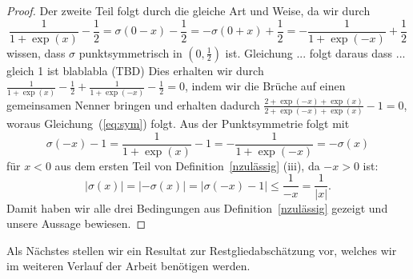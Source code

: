 \begin{proof}
Der zweite Teil folgt durch die gleiche Art und Weise, da wir durch 
\begin{equation}
\label{eq:sym}
\frac{1}{1 + \exp(x)} - \frac{1}{2}= \sigma(0 - x) - \frac{1}{2} = -\sigma(0 + x) + \frac{1}{2} = -\frac{1}{1 + \exp(-x)} + \frac{1}{2}
\end{equation}
wissen, dass $\sigma$ punktsymmetrisch in $(0, \frac{1}{2})$ ist. 
Gleichung ... folgt daraus dass ... gleich 1 ist blablabla (TBD)
Dies erhalten wir durch $\frac{1}{1 + \exp(x)} - \frac{1}{2} +\frac{1}{1 + \exp(-x)} - \frac{1}{2} = 0$, indem wir die Brüche auf einen gemeinsamen Nenner bringen und erhalten dadurch
$\frac{2 + \exp(-x) + \exp(x)}{2 + \exp(-x) + \exp(x)} - 1 = 0$, woraus  Gleichung~(\ref{eq:sym}) folgt.
Aus der Punktsymmetrie folgt mit $$\sigma(- x) - 1 = \frac{1}{1 + \exp(x)} - 1 = -\frac{1}{1 + \exp(-x)} = -\sigma(x)$$ für $x < 0$ aus dem ersten Teil von Definition~\ref{nzulässig} (iii), da $-x > 0 $ ist:  
$$|\sigma(x)| = |-\sigma(x)| = |\sigma(- x) - 1| \leq \frac{1}{-x} = \frac{1}{|x|}.$$
Damit haben wir alle drei Bedingungen aus Definition~\ref{nzulässig} gezeigt und unsere Aussage bewiesen.
\end{proof}
Als Nächstes stellen wir ein Resultat zur Restgliedabschätzung vor, welches wir im weiteren Verlauf der Arbeit benötigen werden.

